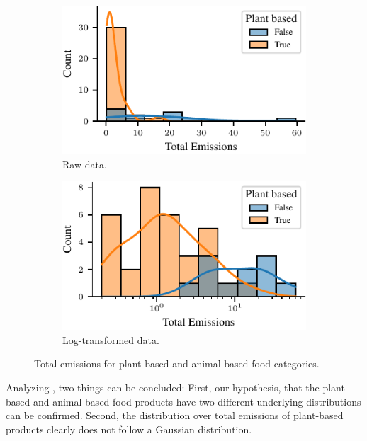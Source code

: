 \documentclass{article}
\begin{document}
\begin{figure}[h]
  \centering
  \begin{subfigure}[b]{0.49\textwidth}
    \includegraphics[width=\textwidth]{figures/emissions.pdf}
    \caption{Raw data.}
    \label{fig:emissions}
  \end{subfigure}%
  \hfill
  \begin{subfigure}[b]{0.49\textwidth}
    \includegraphics[width=\textwidth]{figures/emissions-log.pdf}
    \caption{Log-transformed data.}
    \label{fig:emissions-log}
  \end{subfigure}
  \caption{Total emissions for plant-based and animal-based food categories.}
  \label{fig:emissions-combined}
\end{figure}

Analyzing , two things can be concluded: First, our hypothesis, that the plant-based and animal-based food products have two different underlying distributions can be confirmed. Second, the distribution over total emissions of plant-based products clearly does not follow a Gaussian distribution. 
\end{document}
